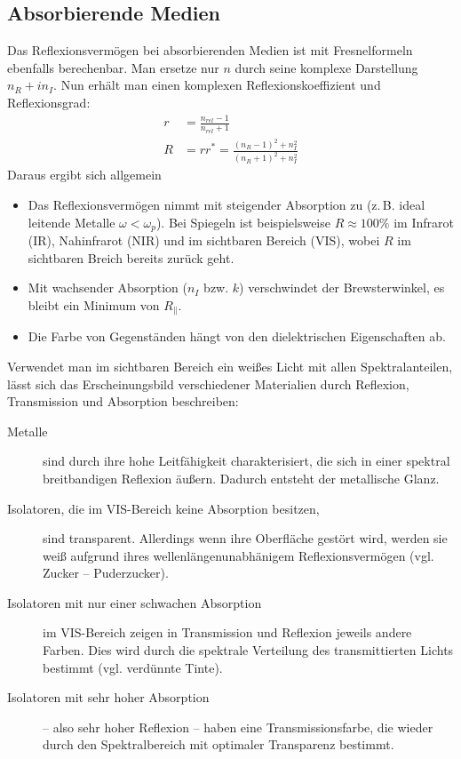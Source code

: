 
\subsection{Absorbierende Medien}
Das Reflexionsvermögen bei absorbierenden Medien ist mit
Fresnelformeln ebenfalls berechenbar. 
Man ersetze nur $n$ durch seine komplexe Darstellung $n_R+in_I$. Nun
erhält man einen komplexen Reflexionskoeffizient und
Reflexionsgrad:
\begin{align*}
  r &= \frac{n_{rel}-1}{n_{rel}+1}\\
  R &= rr^*=\frac{(n_R-1)^2+n_I^2}{(n_R+1)^2+n_I^2}
\end{align*}
Daraus ergibt sich allgemein
\begin{itemize}
\item Das Reflexionsvermögen nimmt mit steigender Absorption
  zu (z.\,B. ideal leitende Metalle $\omega<\omega_p$). Bei Spiegeln
  ist beispielsweise $R\approx100\%$ im Infrarot (IR), Nahinfrarot
  (NIR) und im sichtbaren Bereich (VIS), wobei $R$ im sichtbaren
  Breich bereits zurück geht.
\item Mit wachsender Absorption ($n_I$ bzw. $k$) verschwindet der Brewsterwinkel, es bleibt ein Minimum von $R_{\parallel}$.
\item Die Farbe von Gegenständen hängt von den dielektrischen Eigenschaften ab.
\end{itemize}

Verwendet man im sichtbaren Bereich ein weißes Licht mit allen
Spektralanteilen, lässt sich das Erscheinungsbild verschiedener
Materialien durch Reflexion, Transmission und Absorption beschreiben:
\begin{description}
\item[Metalle] sind durch ihre hohe Leitfähigkeit
  charakterisiert, die sich in einer spektral breitbandigen Reflexion
  äußern. Dadurch entsteht der metallische Glanz.
\item[Isolatoren, die im VIS-Bereich keine Absorption besitzen,]
  sind transparent. Allerdings wenn ihre Oberfläche gestört wird,
  werden sie weiß aufgrund ihres wellenlängenunabhänigem
  Reflexionsvermögen (vgl. Zucker -- Puderzucker). 
\item[Isolatoren mit nur einer schwachen Absorption] im VIS-Bereich
  zeigen in Transmission und Reflexion jeweils andere Farben. Dies
  wird durch die spektrale Verteilung des transmittierten Lichts
  bestimmt (vgl. verdünnte Tinte). 
\item[Isolatoren mit sehr hoher Absorption] -- also sehr hoher
  Reflexion -- haben eine Transmissionsfarbe, die wieder durch den
  Spektralbereich mit optimaler Transparenz bestimmt.
\end{description}

